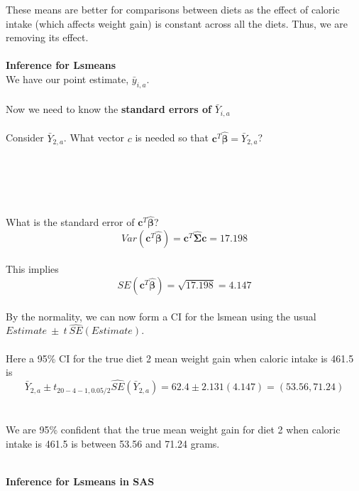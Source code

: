 These means are better for comparisons between diets as the effect of caloric intake (which affects weight gain) is constant across all the diets.  Thus, we are removing its effect.\\~\\

\newpage
\Large\textbf{Inference for Lsmeans}\large\\
We have our point estimate, $\bar{y}_{i,a}$.\\~\\
Now we need to know the \textbf{standard errors of }$\bar{Y}_{i,a}$\\~\\

Consider $\bar{Y}_{2,a}$.  What vector $c$ is needed so that $\textbf{c}^{T}\hat{\boldsymbol{\beta}} = \bar{Y}_{2,a}$? \\~\\~\\~\\~\\~\\

What is the standard error of $\textbf{c}^{T}\hat{\boldsymbol{\beta}}$?\\
$$Var(\textbf{c}^{T}\hat{\boldsymbol{\beta}}) =\textbf{c}^{T}\hat{\boldsymbol{\Sigma}}\textbf{c} = 17.198$$~\\
This implies 
$$SE(\textbf{c}^{T}\hat{\boldsymbol{\beta}})=\sqrt{17.198}=4.147$$~\\

By the normality, we can now form a CI for the lsmean using the usual $Estimate~\pm~t~\hat{SE}(Estimate)$.\\~\\

Here a 95\% CI for the true diet 2 mean weight gain when caloric intake is 461.5 is
$$\bar{Y}_{2,a}\pm t_{20-4-1,0.05/2}\hat{SE}(\bar{Y}_{2,a}) = 62.4 \pm 2.131(4.147) = (53.56,71.24)$$\\~\\

We are 95\% confident that the true mean weight gain for diet 2 when caloric intake is 461.5 is between 53.56 and 71.24 grams.\\~\\

\newpage

\Large\textbf{Inference for Lsmeans in SAS}\large\\

